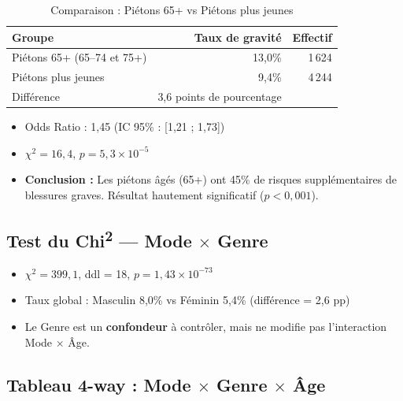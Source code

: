 \documentclass[12pt,a4paper]{article}
\begin{document}
\begin{table}[H]
\centering
\caption{Comparaison : Piétons 65+ vs Piétons plus jeunes}
\label{tab:stratified}
\begin{tabular}{@{}l r r@{}}
\toprule
\textbf{Groupe} & \textbf{Taux de gravité} & \textbf{Effectif} \\
\midrule
Piétons 65+ (65--74 et 75+) & 13,0\% & 1\,624 \\
Piétons plus jeunes          & 9,4\%  & 4\,244 \\
\midrule
Différence                   & 3,6 points de pourcentage & \\
\bottomrule
\end{tabular}
\end{table}

\begin{itemize}
  \item Odds Ratio : 1,45 (IC 95\% : [1,21 ; 1,73])
  \item $\chi^2 = 16,4$, $p = 5,3 \times 10^{-5}$
  \item \textbf{Conclusion :} Les piétons âgés (65+) ont 45\% de risques
        supplémentaires de blessures graves. Résultat hautement significatif
        ($p < 0,001$).
\end{itemize}

\subsection{Test du Chi\textsuperscript{2} --- Mode $\times$ Genre}

\begin{itemize}
  \item $\chi^2 = 399,1$, ddl = 18, $p = 1,43 \times 10^{-73}$
  \item Taux global : Masculin 8,0\% vs Féminin 5,4\% (différence = 2,6 pp)
  \item Le Genre est un \textbf{confondeur} à contrôler, mais ne modifie pas
        l'interaction Mode $\times$ \^Age.
\end{itemize}

\subsection{Tableau 4-way : Mode $\times$ Genre $\times$ \^Age}
\end{document}
